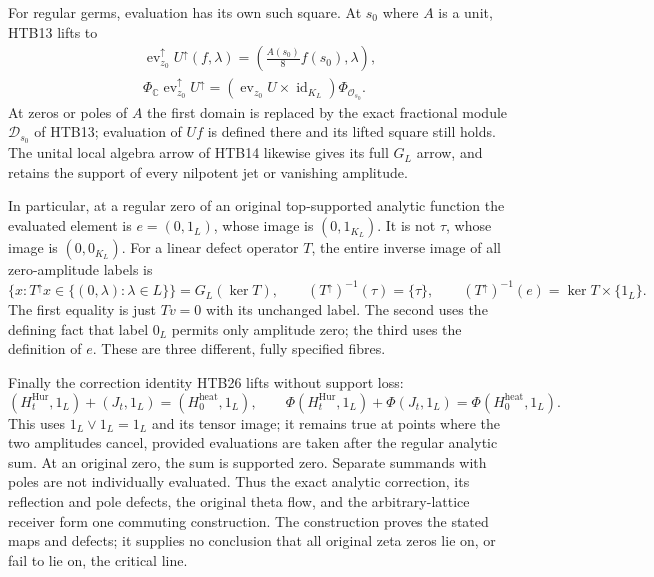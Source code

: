 For regular germs, evaluation has its own such square. At $s_0$ where
$A$ is a unit, HTB13 lifts to
\begin{equation}\tag{HTB32}
\begin{gathered}
 \operatorname{ev}_{z_0}^{\uparrow}U^{\uparrow}(f,\lambda)
 =\left(\frac{A(s_0)}8 f(s_0),\lambda\right),\\
 \Phi_{\mathbb C}\operatorname{ev}_{z_0}^{\uparrow}U^{\uparrow}
 =\left(\operatorname{ev}_{z_0}U\times\operatorname{id}_{K_L}\right)
       \Phi_{\mathcal O_{s_0}}.
\end{gathered}
\end{equation}
At zeros or poles of $A$ the first domain is replaced by the exact
fractional module $\mathcal D_{s_0}$ of HTB13; evaluation of $Uf$ is
defined there and its lifted square still holds. The unital local
algebra arrow of HTB14 likewise gives its full $G_L$ arrow, and
retains the support of every nilpotent jet or vanishing amplitude.

In particular, at a regular zero of an original top-supported analytic
function the evaluated element is $e=(0,1_L)$, whose image is
$(0,1_{K_L})$. It is not $\tau$, whose image is $(0,0_{K_L})$.
For a linear defect operator $T$, the entire inverse image of all
zero-amplitude labels is
\begin{equation}\tag{HTB33}
 \{x:T^{\uparrow}x\in\{(0,\lambda):\lambda\in L\}\}
      =G_L(\ker T),\qquad
 (T^{\uparrow})^{-1}(\tau)=\{\tau\},\qquad
 (T^{\uparrow})^{-1}(e)=\ker T\times\{1_L\}.
\end{equation}
The first equality is just $Tv=0$ with its unchanged label. The second
uses the defining fact that label $0_L$ permits only amplitude zero;
the third uses the definition of $e$. These are three different,
fully specified fibres.

Finally the correction identity HTB26 lifts without support loss:
\begin{equation}\tag{HTB34}
 (H_t^{\mathrm{Hur}},1_L)+(J_t,1_L)
   =(H_0^{\mathrm{heat}},1_L),\qquad
 \Phi(H_t^{\mathrm{Hur}},1_L)+\Phi(J_t,1_L)
   =\Phi(H_0^{\mathrm{heat}},1_L).
\end{equation}
This uses $1_L\vee1_L=1_L$ and its tensor image; it remains true at
points where the two amplitudes cancel, provided evaluations are
taken after the regular analytic sum. At an original zero, the sum
is supported zero. Separate summands with poles are not individually
evaluated. Thus the exact analytic correction, its reflection and pole
defects, the original theta flow, and the arbitrary-lattice receiver
form one commuting construction. The construction proves the stated
maps and defects; it supplies no conclusion that all original zeta
zeros lie on, or fail to lie on, the critical line.

